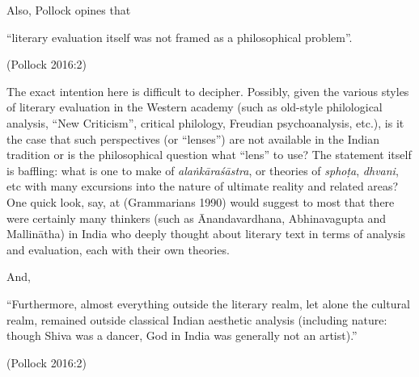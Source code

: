 Also, Pollock opines that 

\begin{myquote}
“literary evaluation itself was not framed as a philosophical problem”. 

\hfill (Pollock 2016:2) 
\end{myquote}

The exact intention here is difficult to decipher. Possibly, given the various styles of literary evaluation in the Western academy (such as old-style philological analysis, “New Criticism”, critical philology, Freudian psychoanalysis, etc.), is it the case that such perspectives (or “lenses”) are not available in the Indian tradition or is the philosophical question what “lens” to use? The statement itself is baffling: what is one to make of \textsl{alaṅkāraśāstra}, or theories of \textsl{sphoṭa}, \textsl{dhvani}, etc with many excursions into the nature of ultimate reality and related areas? One quick look, say, at (Grammarians 1990) would suggest to most that there were certainly many thinkers (such as Ānandavardhana, Abhinavagupta and Mallinātha) in India who deeply thought about literary text in terms of analysis and evaluation, each with their own theories.

And, 

\begin{myquote}
“Furthermore, almost everything outside the literary realm, let alone the cultural realm, remained outside classical Indian aesthetic analysis (including nature: though Shiva was a dancer, God in India was generally not an artist).” 

\hfill (Pollock 2016:2)
\end{myquote}

